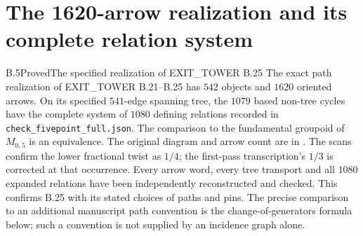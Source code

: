 \section{The 1620-arrow realization and its complete relation system}
\label{sec:1620-audit}

\begin{result}{B.5}{Proved}{The specified realization of EXIT\_TOWER B.25}
The exact path realization of EXIT\_TOWER B.21--B.25 has $542$ objects
and $1620$ oriented arrows.  On its specified $541$-edge spanning tree,
the $1079$ based non-tree cycles have the complete system of $1080$
defining relations recorded in \texttt{check\_fivepoint\_full.json}.
The comparison to the fundamental groupoid of $M_{0,5}$ is an equivalence.
The original diagram and arrow count are in
\cite[manuscript folios~30 and~32, PDF scans~31 and~33]{GrothendieckCote148}.
The scans confirm the lower fractional twist as $1/4$; the
first-pass transcription's $1/3$ is corrected at that occurrence.
Every arrow word, every tree transport and all $1080$ expanded relations
have been independently reconstructed and checked.  This confirms B.25
with its stated choices of paths and pins.  The precise comparison to
an additional manuscript path convention is the change-of-generators
formula below; such a convention is not supplied by an incidence graph
alone.
\end{result}

